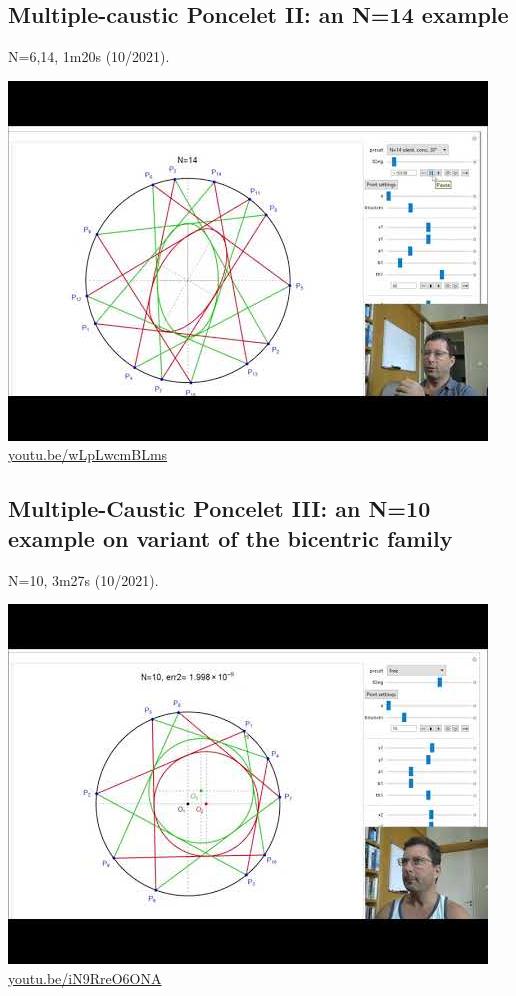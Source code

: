 \documentclass[12pt]{amsart}
\begin{document}
\subsection{Multiple-caustic Poncelet II: an N=14 example}
\label{vid:wLpLwcmBLms}
\noindent N=6,14, 1m20s (10/2021). 
\begin{center}\includegraphics[width=.5\textwidth]{pics/wLpLwcmBLms.jpg} \\ 
\href{https://youtu.be/wLpLwcmBLms}{\url{youtu.be/wLpLwcmBLms}}\end{center}
% 

\subsection{Multiple-Caustic Poncelet III: an N=10 example on variant of the bicentric family}
\label{vid:iN9RreO6ONA}
\noindent N=10, 3m27s (10/2021). 
\begin{center}\includegraphics[width=.5\textwidth]{pics/iN9RreO6ONA.jpg} \\ 
\href{https://youtu.be/iN9RreO6ONA}{\url{youtu.be/iN9RreO6ONA}}\end{center}
% 
\end{document}
